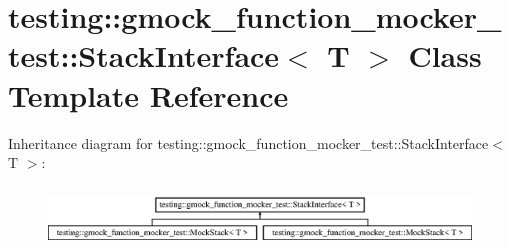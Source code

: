 \hypertarget{classtesting_1_1gmock__function__mocker__test_1_1_stack_interface}{}\section{testing\+::gmock\+\_\+function\+\_\+mocker\+\_\+test\+::Stack\+Interface$<$ T $>$ Class Template Reference}
\label{classtesting_1_1gmock__function__mocker__test_1_1_stack_interface}
Inheritance diagram for testing\+::gmock\+\_\+function\+\_\+mocker\+\_\+test\+::Stack\+Interface$<$ T $>$\+:\begin{figure}[H]
\begin{center}
\leavevmode
\includegraphics[height=1.637427cm]{d8/dee/classtesting_1_1gmock__function__mocker__test_1_1_stack_interface}
\end{center}
\end{figure}
